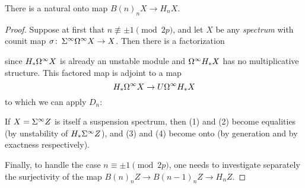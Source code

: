 \begin{lemma}
There is a natural onto map $B(n)_n X \to H_n X$.
\end{lemma}
\begin{proof}
Suppose at first that $n \not\equiv \pm 1 \pmod{2p}$, and let $X$ be any \emph{spectrum} with counit map $\sigma\colon\thinspace \Sigma^\infty \Omega^\infty X \to X$.  Then there is a factorization
\begin{center}
\end{center}
since $H_* \Omega^\infty X$ is already an unstable module and $\Omega^\infty H_* X$ has no multiplicative structure.  This factored map is adjoint to a map \[H_* \Omega^\infty X \to U \Omega^\infty H_* X\] to which we can apply $D_n$:
\begin{center}
\end{center}
If $X = \Sigma^\infty Z$ is itself a suspension spectrum, then (1) and (2) become equalities (by unstability of $H_* \Sigma^\infty Z$), and (3) and (4) become onto (by generation and by exactness respectively).

Finally, to handle the case $n \equiv \pm 1 \pmod{2p}$, one needs to investigate separately the surjectivity of the map $B(n)_n Z \to B(n-1)_n Z \to H_n Z$.  
\end{proof}

\begin{remark}
\end{remark}


